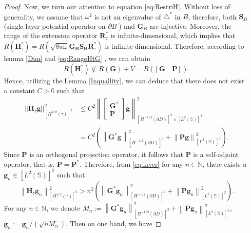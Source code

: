 \documentclass[10pt,a4paper]{amsart}
\begin{document}
\begin{proof}
Now, we turn our attention to equation \eqref{eq:RestriH}. Without loss of generality, we assume that $\omega ^2$ is not an eigenvalue of $ \triangle ^*$ in $B$, therefore, both $\mathbf S _B$ (single-layer potential operator on $\partial B$ ) and $\mathbf G _B$ are injective. Moreover, the range of the extension operator $\mathbf R^*_{\tau} $ is infinite-dimensional, which implies that $ R \left( \mathbf H^*_{\tau} \right) = R \left( \sqrt{8\pi\omega}\mathbf{G_B S_B}  \mathbf R^*_{\tau}   \right) $ is infinite-dimensional. Therefore, according to lemma \ref{Dim} and \eqref{eq:RangeHtG} , we can obtain
$$
R \left( \mathbf H^*_{\tau} \right) \nsubseteq R\left( \mathbf G\right) +V=  R \left( \left[ \mathbf G \quad \mathbf P \right] \right).
$$
Hence, utilizing the Lemma \ref{Inquallity}, we can deduce that there does not exist a constant $C > 0$ such that
\begin{equation}\begin{aligned}\label{eq:inver}
|| \mathbf H_{\tau} \mathbf g ||^2_{\left[H^{1/2}\left(\tau \right) \right] ^2 }
&\leq C^2 \left\| 
\begin{bmatrix}
	\mathbf G^* \\ \mathbf P
\end{bmatrix}
\mathbf g \right\| ^2_{\left[H^{-1/2}\left(\partial D \right) \right] ^2  \times \left[L^{2}\left(\mathbb S \right) \right] ^2}\\
&=  C^2 \left( \left\| \mathbf G^* \mathbf g \right\|^2_{\left[H^{-1/2}\left(\partial D \right) \right] ^2}+\left\| \mathbf P \mathbf g \right\|^2_{\left[L^{2}\left(\mathbb S \right) \right] ^2} \right) .
\end{aligned}\end{equation}
Since $\mathbf P$ is an orthogonal projection operator, it follows that $\mathbf P$ is a self-adjoint operator, that is, $\mathbf P = \mathbf P ^*$. Therefore, from \eqref{eq:inver} for any $n \in \mathbb N$, there exists a $\mathbf g_n \in \left[L^{2}\left(\mathbb S \right) \right] ^2  $ such that
$$
\left\| \mathbf H_{\tau} \mathbf g_n \right\|^2_{\left[H^{1/2}\left(\tau \right) \right] ^2 } > n^2 \left( \left\| \mathbf G^* \mathbf g_n \right\|^2_{\left[H^{-1/2}\left(\partial D \right) \right] ^2}+\left\| \mathbf P \mathbf g_n \right\|^2_{\left[L^{2}\left(\mathbb S \right) \right] ^2} \right).
$$
For any $n \in \mathbb N$, we denote $M_n:=\left\| \mathbf G^* \mathbf g_n \right\|^2_{\left[H^{-1/2}\left(\partial D \right) \right] ^2}+\left\| \mathbf P \mathbf g_n \right\|^2_{\left[L^{2}\left(\mathbb S \right) \right] ^2}$,  $\tilde{\mathbf g_n}:=\mathbf g_n /\left(\sqrt{n M_n} \right) $. Then on one hand, we have

\end{proof}
\end{document}
